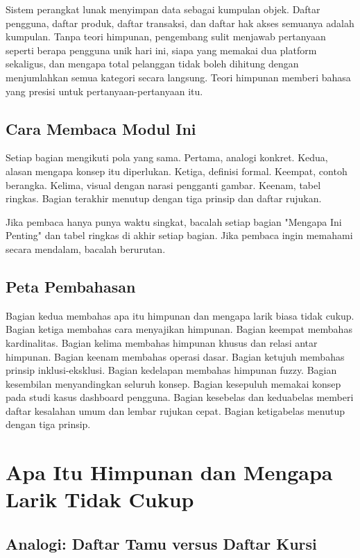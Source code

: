 \documentclass[11pt,a4paper]{article}
\begin{document}
Sistem perangkat lunak menyimpan data sebagai kumpulan objek. Daftar pengguna, daftar produk, daftar transaksi, dan daftar hak akses semuanya adalah kumpulan. Tanpa teori himpunan, pengembang sulit menjawab pertanyaan seperti berapa pengguna unik hari ini, siapa yang memakai dua platform sekaligus, dan mengapa total pelanggan tidak boleh dihitung dengan menjumlahkan semua kategori secara langsung. Teori himpunan memberi bahasa yang presisi untuk pertanyaan-pertanyaan itu.

\subsection{Cara Membaca Modul Ini}

Setiap bagian mengikuti pola yang sama. Pertama, analogi konkret. Kedua, alasan mengapa konsep itu diperlukan. Ketiga, definisi formal. Keempat, contoh berangka. Kelima, visual dengan narasi pengganti gambar. Keenam, tabel ringkas. Bagian terakhir menutup dengan tiga prinsip dan daftar rujukan.

Jika pembaca hanya punya waktu singkat, bacalah setiap bagian "Mengapa Ini Penting" dan tabel ringkas di akhir setiap bagian. Jika pembaca ingin memahami secara mendalam, bacalah berurutan.

\subsection{Peta Pembahasan}

Bagian kedua membahas apa itu himpunan dan mengapa larik biasa tidak cukup. Bagian ketiga membahas cara menyajikan himpunan. Bagian keempat membahas kardinalitas. Bagian kelima membahas himpunan khusus dan relasi antar himpunan. Bagian keenam membahas operasi dasar. Bagian ketujuh membahas prinsip inklusi-eksklusi. Bagian kedelapan membahas himpunan fuzzy. Bagian kesembilan menyandingkan seluruh konsep. Bagian kesepuluh memakai konsep pada studi kasus dashboard pengguna. Bagian kesebelas dan keduabelas memberi daftar kesalahan umum dan lembar rujukan cepat. Bagian ketigabelas menutup dengan tiga prinsip.

\section{Apa Itu Himpunan dan Mengapa Larik Tidak Cukup}

\subsection{Analogi: Daftar Tamu versus Daftar Kursi}
\end{document}

